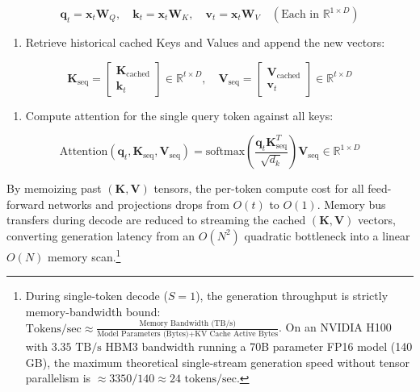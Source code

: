 \documentclass[
  letterpaper,
]{scrbook}
\providecommand{\tightlist}{%
  \setlength{\itemsep}{0pt}\setlength{\parskip}{0pt}}
\begin{document}
\[\mathbf{q}_t = \mathbf{x}_t \mathbf{W}_Q, \quad \mathbf{k}_t = \mathbf{x}_t \mathbf{W}_K, \quad \mathbf{v}_t = \mathbf{x}_t \mathbf{W}_V \quad (\text{Each in } \mathbb{R}^{1 \times D})\]

\begin{enumerate}
\def\labelenumi{\arabic{enumi}.}
\setcounter{enumi}{2}
\tightlist
\item
  Retrieve historical cached Keys and Values and append the new vectors:
\end{enumerate}

\[\mathbf{K}_{\text{seq}} = \begin{bmatrix} \mathbf{K}_{\text{cached}} \\ \mathbf{k}_t \end{bmatrix} \in \mathbb{R}^{t \times D}, \quad \mathbf{V}_{\text{seq}} = \begin{bmatrix} \mathbf{V}_{\text{cached}} \\ \mathbf{v}_t \end{bmatrix} \in \mathbb{R}^{t \times D}\]

\begin{enumerate}
\def\labelenumi{\arabic{enumi}.}
\setcounter{enumi}{3}
\tightlist
\item
  Compute attention for the single query token against all keys:
\end{enumerate}

\[\text{Attention}(\mathbf{q}_t, \mathbf{K}_{\text{seq}}, \mathbf{V}_{\text{seq}}) = \text{softmax}\left( \frac{\mathbf{q}_t \mathbf{K}_{\text{seq}}^T}{\sqrt{d_k}} \right) \mathbf{V}_{\text{seq}} \in \mathbb{R}^{1 \times D}\]

By memoizing past \((\mathbf{K}, \mathbf{V})\) tensors, the per-token
compute cost for all feed-forward networks and projections drops from
\(O(t)\) to \(O(1)\). Memory bus transfers during decode are reduced to
streaming the cached \((\mathbf{K}, \mathbf{V})\) vectors, converting
generation latency from an \(O(N^2)\) quadratic bottleneck into a linear
\(O(N)\) memory scan.\footnote{During single-token decode (\(S=1\)), the
  generation throughput is strictly memory-bandwidth bound:
  \(\text{Tokens/sec} \approx \frac{\text{Memory Bandwidth (TB/s)}}{\text{Model Parameters (Bytes)} + \text{KV Cache Active Bytes}}\).
  On an NVIDIA H100 with \(3.35\text{ TB/s}\) HBM3 bandwidth running a
  70B parameter FP16 model (140 GB), the maximum theoretical
  single-stream generation speed without tensor parallelism is
  \(\approx 3350 / 140 \approx 24\text{ tokens/sec}\).}
\end{document}
